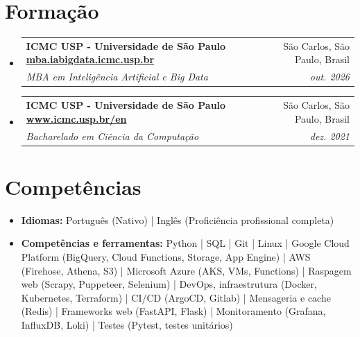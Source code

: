 \documentclass[letterpaper,11pt]{article}
\makeatletter
\newcommand{\resumeItemNoTitle}[1]{
    \item\small{
        {#1 \vspace{-2pt}}
    }
}
\newcommand{\resumeSubheading}[4]{
  \vspace{-1pt}\item
    \begin{tabular*}{0.97\textwidth}[t]{l@{\extracolsep{\fill}}r}
      \textbf{#1} & #2 \\
      \textit{\small#3} & \textit{\small #4} \\
    \end{tabular*}\vspace{-5pt}
}
\newcommand{\resumeSubHeadingListStart}{\begin{itemize}[leftmargin=*]}
\newcommand{\resumeSubHeadingListEnd}{\end{itemize}}
\newcommand{\resumeItemListStart}{\begin{itemize}[leftmargin=*]\setlength\itemsep{1mm}}
\newcommand{\resumeItemListEnd}{\end{itemize}\vspace{-5pt}}
\makeatother
\begin{document}
\section{Formação}
  \resumeSubHeadingListStart
    \resumeSubheading
      {ICMC USP - Universidade de São Paulo \href{https://mba.iabigdata.icmc.usp.br/}{mba.iabigdata.icmc.usp.br}}{São Carlos, São Paulo, Brasil}
      {MBA em Inteligência Artificial e Big Data }{out. 2026}

    \resumeSubheading
      {ICMC USP - Universidade de São Paulo \href{https://www.icmc.usp.br/en/}{www.icmc.usp.br/en}}{São Carlos, São Paulo, Brasil}
      {Bacharelado em Ciência da Computação }{dez. 2021}

  \resumeSubHeadingListEnd
 
    

\section{Competências}
  \resumeItemListStart
    \resumeItemNoTitle{\textbf{Idiomas:} Português (Nativo) | Inglês (Proficiência profissional completa)}
    \resumeItemNoTitle{\textbf{Competências e ferramentas:} Python | SQL | Git | Linux | Google Cloud Platform (BigQuery, Cloud Functions, Storage, App Engine) | AWS (Firehose, Athena, S3) | Microsoft Azure (AKS, VMs, Functions) | Raspagem web (Scrapy, Puppeteer, Selenium) | DevOps, infraestrutura (Docker, Kubernetes, Terraform) | CI/CD (ArgoCD, Gitlab) | Mensageria e cache (Redis) | Frameworks web (FastAPI, Flask) | Monitoramento (Grafana, InfluxDB, Loki) | Testes (Pytest, testes unitários)}
  \resumeItemListEnd


\end{document}
